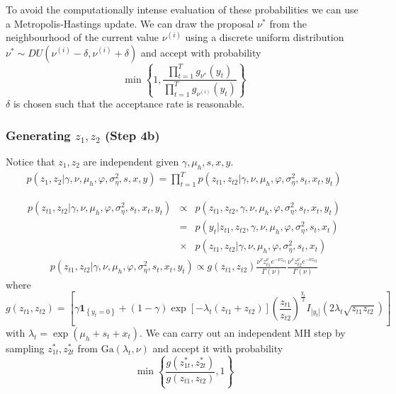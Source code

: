 \documentclass[12pt]{article}
\newcommand\mathbbm[1]{\mathbf{#1}}
\begin{document}
To avoid the computationally intense evaluation of these probabilities we can use a Metropolis-Hastings update. We can draw the proposal $\nu^{*}$ from the neighbourhood of the current value $\nu^{(i)}$ using a discrete uniform distribution $ \nu^{*} \sim DU(\nu^{(i)}-\delta ,\nu^{(i)}+\delta )$ and accept with probability
\begin{equation}
\min \left\{1, \frac{ \prod_{t=1}^{T} g_{\nu^{*}}(y_t) }{ \prod_{t=1}^{T}g_{\nu^{(i)}}(y_t) }  \right\}
\end{equation}
 $\delta$ is  chosen such that the acceptance rate is reasonable.

\subsubsection*{Generating $z_1 , z_2$ (Step 4b) }

Notice that $ z_1 , z_2$ are independent given $ \gamma , \mu_{h},s, x, y$.
\begin{eqnarray}
p(  z_1 , z_2 | \gamma, \nu, \mu_{h} ,\varphi,\sigma^{2}_{\eta},s,x ,y) = \prod \limits_{t=1}^{T} p(  z_{t1} , z_{t2} | \gamma, \nu, \mu_{h} ,\varphi,\sigma^{2}_{\eta},s_t,x_t ,y_t)
\end{eqnarray}

\begin{eqnarray}
p(  z_{t1} , z_{t2} | \gamma, \nu, \mu_{h} ,\varphi,\sigma^{2}_{\eta},s_t,x_t ,y_t) &\propto& p(  z_{t1} , z_{t2}, \gamma, \nu, \mu_{h} ,\varphi,\sigma^{2}_{\eta},s_t,x_t ,y_t) \nonumber \\ &=& p( y_t |  z_{t1}, z_{t2}, \gamma, \nu, \mu_{h} ,\varphi,\sigma^{2}_{\eta},s_t,x_t ) \nonumber \\
&\times& p(   z_{t1} , z_{t2} | \gamma, \nu, \mu_{h} ,\varphi,\sigma^{2}_{\eta},s_t,x_t ) 
\end{eqnarray}
\begin{eqnarray}
p(  z_{t1} , z_{t2} | \gamma, \nu, \mu_{h} ,\varphi,\sigma^{2}_{\eta},s_t,x_t ,y_t)  \propto g(z_{t1} ,z_{t2})\frac{\nu^\nu z_{t1}^{\nu} e^{-\nu z_{t1}}}{ \Gamma(\nu)}
\frac{\nu^\nu z_{t2}^{\nu} e^{-\nu z_{t2}}}{ \Gamma(\nu)}
\end{eqnarray}
where
\begin{equation}
g(z_{t1} ,z_{t2})= \left[ \gamma \mathbbm{1}_{\left\{y_t =0 \right\}} + (1-\gamma) \exp \left[-\lambda_t (z_{t1} + z_{t2}) \right] \left(\frac{ z_{t1} }{  z_{t2} } \right)^{\frac{y_t}{2}} I_{|y_t |} ( 2 \lambda_t \sqrt{ z_{t1}z_{t2}}) \right]
\end{equation}
with $\lambda_t=\exp(\mu_{h}+ s_t+x_t)$.
We can carry out an independent  MH step by sampling $z^{*}_{1t} ,z^{*}_{2t}$ from $\text{Ga}( \lambda_t , \nu) $
and accept it with probability 
\begin{equation}
\min \left\{ \frac{g(z^{*}_{1t} ,z^{*}_{2t})}{g(z_{t1} ,z_{t2})} ,1 \right\}
\end{equation}
\end{document}
